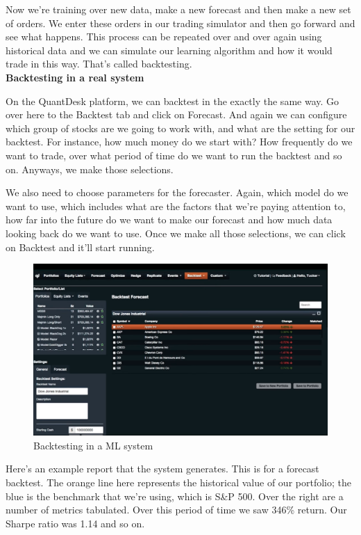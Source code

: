 \documentclass[12pt]{article}
\begin{document}
Now we're training over new data, make a new forecast and then make a new set of orders. We enter these orders in our trading simulator and then go forward and see what happens. This process can be repeated over and over again using historical data and we can simulate our learning algorithm and how it would trade in this way. That's called backtesting. \\[8pt]
\noindent
\textbf{Backtesting in a real system}

On the QuantDesk platform, we can backtest in the exactly the same way. Go over here to the Backtest tab and click on Forecast. And again we can configure which group of stocks are we going to work with, and what are the setting for our backtest. For instance, how much money do we start with? How frequently do we want to trade, over what period of time do we want to run the backtest and so on. Anyways, we make those selections. 

We also need to choose parameters for the forecaster. Again, which model do we want to use, which includes what are the factors that we're paying attention to, how far into the future do we want to make our forecast and how much data looking back do we want to use. Once we make all those selections, we can click on Backtest and it'll start running. 

\begin{figure}[!ht]
\centering
\includegraphics[scale=0.35]{fig/fig78}
\caption{Backtesting in a ML system}
\end{figure}

Here's an example report that the system generates. This is for a forecast backtest. The orange line here represents the historical value of our portfolio; the blue is the benchmark that we're using, which is S\&P 500. Over the right are a number of metrics tabulated. Over this period of time we saw 346\% return. Our Sharpe ratio was 1.14 and so on. 
\end{document}
